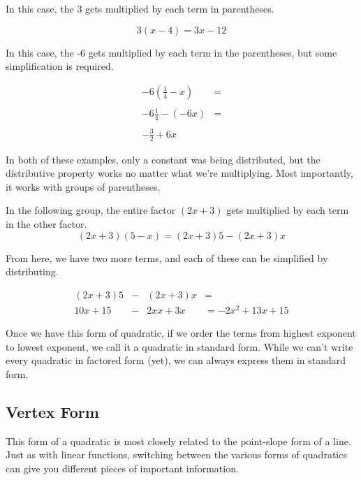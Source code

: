 \begin{example}\label{Distributive Example}

In this case, the 3 gets multiplied by each term in parentheses.

$$3(x-4) = 3x - 12$$

In this case, the -6 gets multiplied by each term in the parentheses, but some simplification is required.

$$\begin{array}{rl}
-6(\frac{1}{4}- x) & = \\ & \\
-6\frac{1}{4} -(-6x) & = \\ & \\
-\frac{3}{2} + 6x\end{array}$$

\end{example}

In both of these examples, only a constant was being distributed, but the distributive property works no matter what we're multiplying.  Most importantly, it works with groups of parentheses.

\begin{example}

In the following group, the entire factor $(2x + 3)$ gets multiplied by each term in the other factor.
$$(2x + 3)(5-x) = (2x+3)5 - (2x+3)x$$

From here, we have two more terms, and each of these can be simplified by distributing.

$$\begin{array}{rcll}
(2x + 3)5 & - & (2x + 3)x & = \\
10x+15 & - & 2xx+3x & = -2x^2 + 13x + 15\end{array}$$
\end{example}

Once we have this form of quadratic, if we order the terms from highest exponent to lowest exponent, we call it a quadratic in standard form.  While we can't write every quadratic in factored form (yet), we can always express them in standard form.

\subsection*{Vertex Form}

This form of a quadratic is most closely related to the point-slope form of a line.  Just as with linear functions, switching between the various forms of quadratics can give you different pieces of important information.


